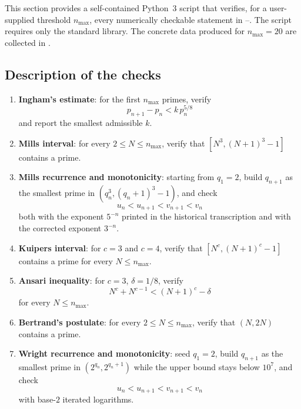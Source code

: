 \documentclass[11pt,reqno]{amsart}
\theoremstyle{redplain}
\numberwithin{equation}{section}
\begin{document}
\label{sec:python}

This section provides a self-contained Python~3 script that verifies, for a
user-supplied threshold $n_{\max}$, every numerically checkable statement in %
--. The script requires only
the standard library. The concrete data produced for $n_{\max}=20$ are
collected in .

\subsection{Description of the checks}

\begin{enumerate}
\item \textbf{Ingham's estimate}: for the first $n_{\max }$ primes, verify 
\begin{equation}
p_{n+1}-p_{n}<k\,p_{n}^{5/8}
\end{equation}
and report the smallest admissible $k$.

\item \textbf{Mills interval}: for every $2\le N\le n_{\max}$, verify that $%
[N^3,(N+1)^3-1]$ contains a prime.

\item \textbf{Mills recurrence and monotonicity}: starting from $q_{1}=2$,
build $q_{n+1}$ as the smallest prime in $(q_{n}^{3},(q_{n}+1)^{3}-1)$, and
check 
\begin{equation}
u_{n}<u_{n+1}<v_{n+1}<v_{n}
\end{equation}%
both with the exponent $5^{-n}$ printed in the historical transcription and
with the corrected exponent $3^{-n}$.

\item \textbf{Kuipers interval}: for $c=3$ and $c=4$, verify that $%
[N^c,(N+1)^c-1]$ contains a prime for every $N\le n_{\max}$.

\item \textbf{Ansari inequality}: for $c=3$, $\delta =1/8$, verify 
\begin{equation}
N^{c}+N^{c-1}<(N+1)^{c}-\delta
\end{equation}
for every $N\leq n_{\max }$.

\item \textbf{Bertrand's postulate}: for every $2\le N\le n_{\max}$, verify
that $(N,2N)$ contains a prime.

\item \textbf{Wright recurrence and monotonicity}: seed $q_{1}=2$, build $%
q_{n+1}$ as the smallest prime in $(2^{q_{n}},2^{q_{n}+1})$ while the upper
bound stays below $10^{7}$, and check 
\begin{equation}
u_{n}<u_{n+1}<v_{n+1}<v_{n}
\end{equation}
with base-$2$ iterated logarithms.


\end{enumerate}
\end{document}
